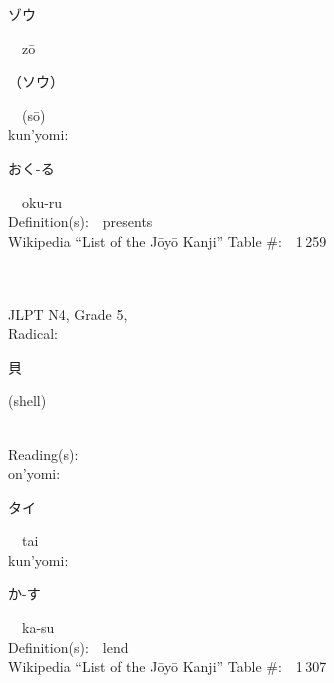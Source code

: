 \begin{multicols}{2}
{\hspace*{2em}}{\begin{CJK}{UTF8}{min} ゾウ \end{CJK}}\ \ z\=o\ \ \\
{\hspace*{2em}}{\begin{CJK}{UTF8}{min} （ソウ） \end{CJK}}\ \ (s\=o)\ \ \\
{\hspace*{1em}}kun'yomi:\ \ \\
{\hspace*{2em}}{\begin{CJK}{UTF8}{min} おく-る \end{CJK}}\ \ oku-ru\ \ \\
Definition(s):\ \ presents \\
Wikipedia ``List of the J\=oy\=o Kanji'' Table \#:\ \ 1\,259 \\
\ \ \\
{\fontsize{34pt}{40pt}  }\ \ \\  %
{JLPT N4, Grade 5, \\Radical:\ \ {\begin{CJK}{UTF8}{min} 貝 \end{CJK}} (shell) } \\
Reading(s):\ \ \\
{\hspace*{1em}}on'yomi:\ \ \\
{\hspace*{2em}}{\begin{CJK}{UTF8}{min} タイ \end{CJK}}\ \ tai\ \ \\
{\hspace*{1em}}kun'yomi:\ \ \\
{\hspace*{2em}}{\begin{CJK}{UTF8}{min} か-す \end{CJK}}\ \ ka-su\ \ \\
Definition(s):\ \ lend \\
Wikipedia ``List of the J\=oy\=o Kanji'' Table \#:\ \ 1\,307 \\
\ \ \\
{\fontsize{34pt}{40pt}  }\ \ \\  %

\end{multicols}
